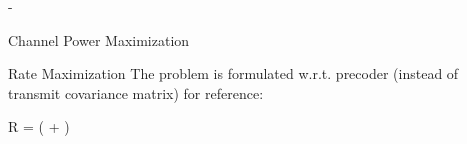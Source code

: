 \documentclass[journal]{IEEEtran}
\begin{document}
\begin{section}{-}
\begin{subsection}{Channel Power Maximization}

	\end{subsection}

	\begin{subsection}{Rate Maximization}
		The problem is formulated w.r.t. precoder (instead of transmit covariance matrix) for reference:
		\begin{maxi!}
			{}{R = \log \det \biggl( + \biggr)}{\label{op:pc_rate}}{\label{ob:pc_rate}}
		\end{maxi!}


\end{subsection}
\end{section}
\end{document}
